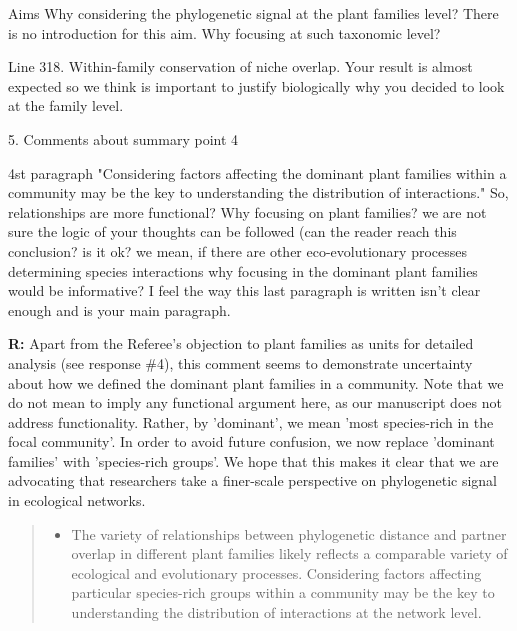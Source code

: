 \documentclass[12pt]{letter}
\newenvironment{refquote}{\bigskip \begin{it}}{\end{it}\smallskip}
\begin{document}
		\begin{refquote}
		Aims
		Why considering the phylogenetic signal at the plant families level? There is no introduction for this aim. Why focusing at such taxonomic level?
		\end{refquote}


		\begin{refquote}
			Line 318. Within-family conservation of niche overlap. Your result is almost expected so we think is important to justify biologically why you decided to look at the family level.
		\end{refquote}


	5. Comments about summary point 4

		\begin{refquote}
		4st paragraph "Considering factors affecting the dominant plant families within
		a community may be the key to understanding the distribution of interactions." So, relationships are more functional? Why focusing on plant families? we are not sure the logic of your thoughts can be followed (can the reader reach this conclusion? is it ok? we mean, if there are other eco-evolutionary processes determining species interactions why focusing in the dominant plant families would be informative? I feel the way this last paragraph is written isn't clear enough and is your main paragraph.
		\end{refquote}


		\textbf{R:} Apart from the Referee's objection to plant families as units for detailed analysis (see response \#4), this comment seems to demonstrate uncertainty about how we defined the dominant plant families in a community. Note that we do not mean to imply any functional argument here, as our manuscript does not address functionality. Rather, by 'dominant', we mean 'most species-rich in the focal community'. In order to avoid future confusion, we now replace 'dominant families' with 'species-rich groups'. We hope that this makes it clear that we are advocating that researchers take a finer-scale perspective on phylogenetic signal in ecological networks.


		\begin{quotation}
			\begin{itemize}
		    \item The variety of relationships between phylogenetic distance and partner overlap in different plant families likely reflects a comparable variety of ecological and evolutionary processes. Considering factors affecting particular species-rich groups within a community may be the key to understanding the distribution of interactions at the network level.
			\end{itemize}
		\end{quotation}
\end{document}
